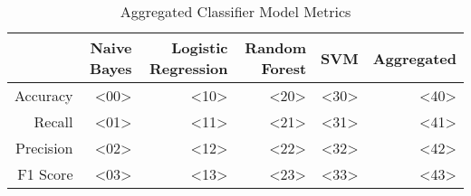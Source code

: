 \begin{table}[h]
    \centering
    \begin{tabular}{r|r|r|r|r|r}
         & Naive Bayes & Logistic Regression & Random Forest & SVM & Aggregated \\\hline
        Accuracy    & <00> & <10> & <20> & <30> & <40>\\
        Recall      & <01> & <11> & <21> & <31> & <41>\\
        Precision   & <02> & <12> & <22> & <32> & <42>\\
        F1 Score    & <03> & <13> & <23> & <33> & <43>
\end{tabular}
    \caption{Aggregated Classifier Model Metrics}
    \label{tab:model_metrics}
\end{table}